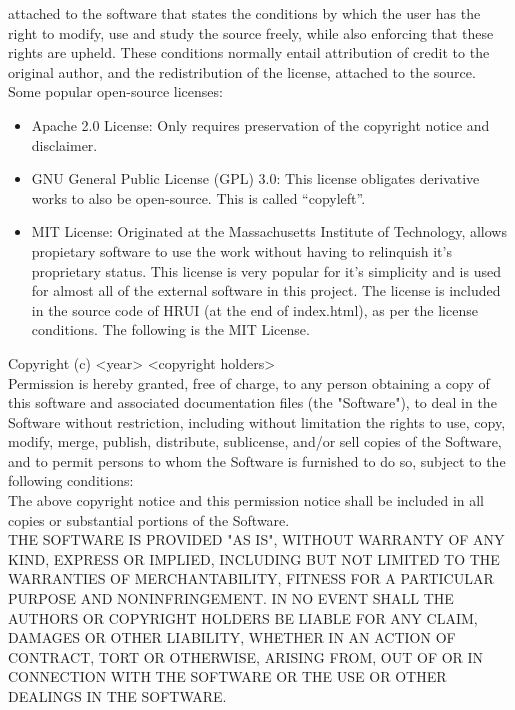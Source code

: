 attached to the software that states the conditions by which the user has the right to modify, use and study the source 
freely, while also enforcing that these rights are upheld. These conditions normally entail attribution of credit to the 
original author, and the redistribution of the license, attached to the source. Some popular open-source licenses:
\begin{itemize}
	\item Apache 2.0 License: Only requires preservation of the copyright notice and disclaimer.
	\item GNU General Public License (GPL) 3.0: This license obligates derivative works to also be open-source. This is 
	called ``copyleft''.
	\item MIT License: Originated at the Massachusetts Institute of Technology, allows propietary software to use the work 
	without having to relinquish it's proprietary status. This license is very popular for it's simplicity and is used for 
	almost all of the external software in this project. The license is included in the source code of HRUI (at the end of 
	index.html), as per the license conditions. The following is the MIT License.\\
\end{itemize}
Copyright (c) <year> <copyright holders>\\

Permission is hereby granted, free of charge, to any person obtaining a copy of this software and associated documentation 
files (the "Software"), to deal in the Software without restriction, including without limitation the rights to use, copy, 
modify, merge, publish, distribute, sublicense, and/or sell copies of the Software, and to permit persons to whom the 
Software is furnished to do so, subject to the following conditions:\\

The above copyright notice and this permission notice shall be included in all copies or substantial portions of the 
Software.\\

THE SOFTWARE IS PROVIDED "AS IS", WITHOUT WARRANTY OF ANY KIND, EXPRESS OR IMPLIED, INCLUDING BUT NOT LIMITED TO THE 
WARRANTIES OF MERCHANTABILITY, FITNESS FOR A PARTICULAR PURPOSE AND NONINFRINGEMENT. IN NO EVENT SHALL THE AUTHORS OR 
COPYRIGHT HOLDERS BE LIABLE FOR ANY CLAIM, DAMAGES OR OTHER LIABILITY, WHETHER IN AN ACTION OF CONTRACT, TORT OR OTHERWISE, 
ARISING FROM, OUT OF OR IN CONNECTION WITH THE SOFTWARE OR THE USE OR OTHER DEALINGS IN THE SOFTWARE.\\

